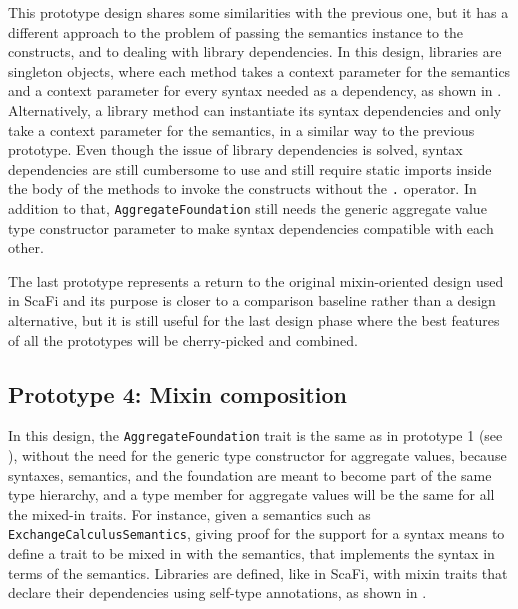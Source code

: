 This prototype design shares some similarities with the previous one, but it has a different approach to the problem of passing the semantics instance to the constructs, and to dealing with library dependencies.
%
In this design, libraries are singleton objects, where each method takes a context parameter for the semantics and a context parameter for every syntax needed as a dependency, as shown in .
%
Alternatively, a library method can instantiate its syntax dependencies and only take a context parameter for the semantics, in a similar way to the previous prototype.
%
Even though the issue of library dependencies is solved, syntax dependencies are still cumbersome to use and still require static imports inside the body of the methods to invoke the constructs without the \texttt{.} operator.
%
In addition to that, \texttt{AggregateFoundation} still needs the generic aggregate value type constructor parameter to make syntax dependencies compatible with each other.



The last prototype represents a return to the original mixin-oriented design used in ScaFi and its purpose is closer to a comparison baseline rather than a design alternative, but it is still useful for the last design phase where the best features of all the prototypes will be cherry-picked and combined.

\subsection{Prototype 4: Mixin composition} \label{chap:design->sec:dsl->subsec:prototype-4-mixin-composition}

In this design, the \texttt{AggregateFoundation} trait is the same as in prototype 1 (see ), without the need for the generic type constructor for aggregate values, because syntaxes, semantics, and the foundation are meant to become part of the same type hierarchy, and a type member for aggregate values will be the same for all the mixed-in traits.
%
For instance, given a semantics such as \texttt{ExchangeCalculusSemantics}, giving proof for the support for a syntax means to define a trait to be mixed in with the semantics, that implements the syntax in terms of the semantics.
%
Libraries are defined, like in ScaFi, with mixin traits that declare their dependencies using self-type annotations, as shown in .

